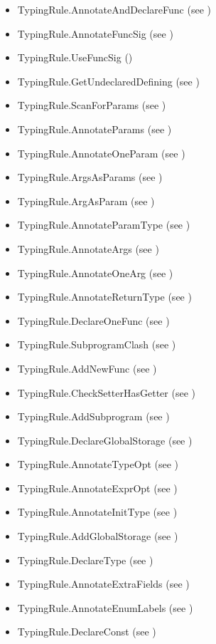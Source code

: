 \begin{itemize}
  \item TypingRule.AnnotateAndDeclareFunc (see )
  \item TypingRule.AnnotateFuncSig (see )
  \item TypingRule.UseFuncSig ()
  \item TypingRule.GetUndeclaredDefining (see )
  \item TypingRule.ScanForParams (see )
  \item TypingRule.AnnotateParams (see )
  \item TypingRule.AnnotateOneParam (see )
  \item TypingRule.ArgsAsParams (see )
  \item TypingRule.ArgAsParam (see )
  \item TypingRule.AnnotateParamType (see )
  \item TypingRule.AnnotateArgs (see )
  \item TypingRule.AnnotateOneArg (see )
  \item TypingRule.AnnotateReturnType (see )
  \item TypingRule.DeclareOneFunc (see )
  \item TypingRule.SubprogramClash (see )
  \item TypingRule.AddNewFunc (see )
  \item TypingRule.CheckSetterHasGetter (see )
  \item TypingRule.AddSubprogram (see )
  \item TypingRule.DeclareGlobalStorage (see )
  \item TypingRule.AnnotateTypeOpt (see )
  \item TypingRule.AnnotateExprOpt (see )
  \item TypingRule.AnnotateInitType (see )
  \item TypingRule.AddGlobalStorage (see )
  \item TypingRule.DeclareType (see )
  \item TypingRule.AnnotateExtraFields (see )
  \item TypingRule.AnnotateEnumLabels (see )
  \item TypingRule.DeclareConst (see )
\end{itemize}

